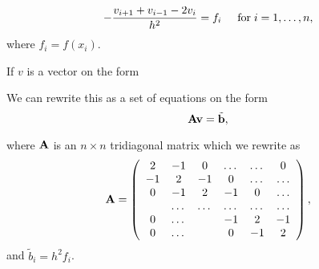 \documentclass[12pt]{article}
\begin{document}
\[
   -\frac{v_{i+1}+v_{i-1}-2v_i}{h^2} = f_i  \hspace{0.5cm} \mathrm{for} \hspace{0.1cm} i=1,\dots, n,
\]
where $f_i=f(x_i)$.



If $v$ is a vector on the form 


We can rewrite this as a set of equations on the form \[
   {\bf A}{\bf v} = \tilde{{\bf b}},
\]

where ${\bf A}$ is an $n\times n$  tridiagonal matrix which we rewrite as 
\begin{equation}
    {\bf A} = \left(\begin{array}{cccccc}
                           2& -1& 0 &\dots   & \dots &0 \\
                           -1 & 2 & -1 &0 &\dots &\dots \\
                           0&-1 &2 & -1 & 0 & \dots \\
                           & \dots   & \dots &\dots   &\dots & \dots \\
                           0&\dots   &  &-1 &2& -1 \\
                           0&\dots    &  & 0  &-1 & 2 \\
                      \end{array} \right),
\end{equation}
and $\tilde{b}_i=h^2f_i$.
\end{document}
